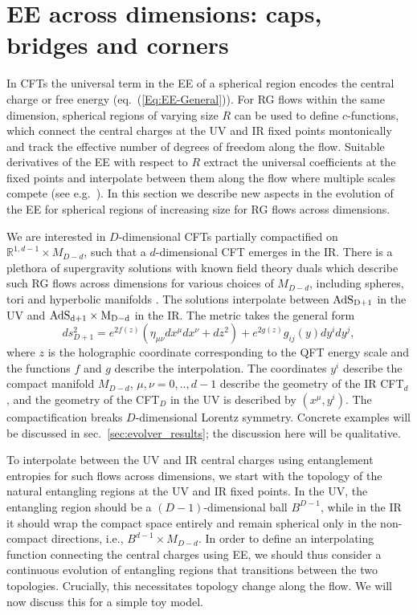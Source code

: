 \documentclass[11 pt]{article}
\def\RR{{\mathds{R}}}
\begin{document}
\section{EE across dimensions: caps, bridges and corners}
\label{sec:across_dim}

In CFTs the universal term in the EE of a spherical region encodes the central charge or free energy (eq.~(\ref{Eq:EE-General})). For RG flows within the same dimension, spherical regions of varying size $R$ can be used to define $c$-functions, which connect the central charges at the UV and IR fixed points montonically and track the effective number of degrees of freedom along the flow. Suitable derivatives of the EE with respect to $R$ extract the universal coefficients at the fixed points and interpolate between them along the flow where multiple scales compete (see e.g.\ \cite{Liu:2012eea,Casini:2017vbe}).
%
In this section we describe new aspects in the evolution of the EE for spherical regions of increasing size for RG flows across dimensions.

We are interested in $D$-dimensional CFTs partially compactified on $\RR^{1,d-1}\times M_{D-d}$, such that a $d$-dimensional CFT emerges in the IR. There is a plethora of supergravity solutions with known field theory duals which describe such RG flows across dimensions for various choices of $M_{D-d}$, including spheres, tori and hyperbolic manifolds \cite{Maldacena:2000mw,Acharya:2000mu,Gauntlett:2000ng,Gauntlett:2001qs,Gauntlett:2001jj,Benini:2013cda,Benini:2015bwz,Bobev:2017uzs}. 
The solutions interpolate between $\rm AdS_{D+1}$ in the UV and $\rm AdS_{d+1}\times M_{D-d}$ in the IR. The metric takes the general form 
\begin{equation}
	ds^2_{D+1}=e^{2f(z)}\left(\eta_{\mu\nu}dx^\mu dx^\nu+ dz^2\right) + e^{2g(z)} g_{ij}(y)dy^i dy^j,\label{flow:across}
\end{equation}
where $z$ is the holographic coordinate corresponding to the QFT energy scale and the functions $f$ and $g$ describe the interpolation. 
%
 The coordinates $y^i$ describe the compact manifold $M_{D-d}$,  $\mu,\nu=0,.., d-1$ describe the geometry of the IR CFT$_d$, and the geometry of the CFT$_D$ in the UV is described by $(x^\mu, y^i)$. 
The compactification breaks $D$-dimensional Lorentz symmetry. Concrete examples will be discussed in sec.~\ref{sec:evolver_results}; the discussion here will be qualitative.

To interpolate between the UV and IR central charges using entanglement entropies for such flows across dimensions, we start with the topology of the natural entangling regions at the UV and IR fixed points. In the UV, the entangling region should be a $(D-1)$-dimensional ball $B^{D-1}$, while in the IR it should wrap the compact space entirely and remain spherical only in the non-compact directions, i.e.,  $B^{d-1}\times M_{D-d}$. In order to define an interpolating function connecting the central charges using EE, we should thus consider a continuous evolution of entangling regions that transitions between the two topologies. Crucially, this necessitates topology change along the flow. We will now discuss this for a simple toy model.
\end{document}
